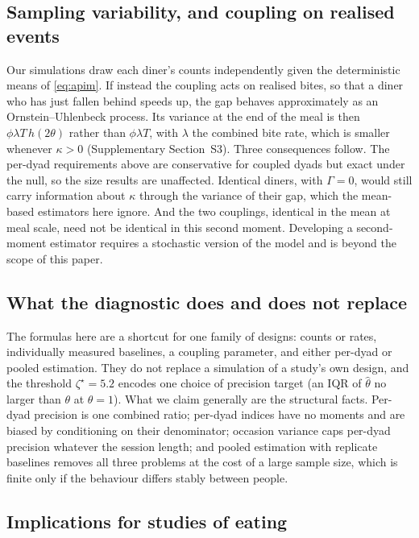 \documentclass[12pt]{article}
\begin{document}
\subsection*{Sampling variability, and coupling on realised events}

Our simulations draw each diner's counts independently given the deterministic
means of \eqref{eq:apim}. If instead the coupling acts on realised bites, so that
a diner who has just fallen behind speeds up, the gap behaves approximately as an
Ornstein--Uhlenbeck process. Its variance at the end of the meal is then
$\phi\lambda T\,h(2\theta)$ rather than $\phi\lambda T$, with $\lambda$ the
combined bite rate, which is smaller whenever $\kappa>0$ (Supplementary
Section~S3). Three consequences follow. The
per-dyad requirements above are conservative for coupled dyads but exact under
the null, so the size results are unaffected. Identical diners, with $\Gamma=0$,
would still carry information about $\kappa$ through the variance of their gap,
which the mean-based estimators here ignore. And the two couplings, identical in
the mean at meal scale, need not be identical in this second moment. Developing a
second-moment estimator requires a stochastic version of the model and is beyond
the scope of this paper.

\subsection*{What the diagnostic does and does not replace}

The formulas here are a shortcut for one family of designs: counts or rates,
individually measured baselines, a coupling parameter, and either per-dyad or
pooled estimation. They do not replace a simulation of a study's own design, and
the threshold $\zeta^\star=5.2$ encodes one choice of precision target (an IQR of
$\hat\theta$ no larger than $\theta$ at $\theta=1$). What we claim generally are
the structural facts. Per-dyad precision is one combined ratio; per-dyad indices
have no moments and are biased by conditioning on their denominator; occasion
variance caps per-dyad precision whatever the session length; and pooled
estimation with replicate baselines removes all three problems at the cost of a
large sample size, which is finite only if the behaviour differs stably between
people.

\subsection*{Implications for studies of eating}
\end{document}
